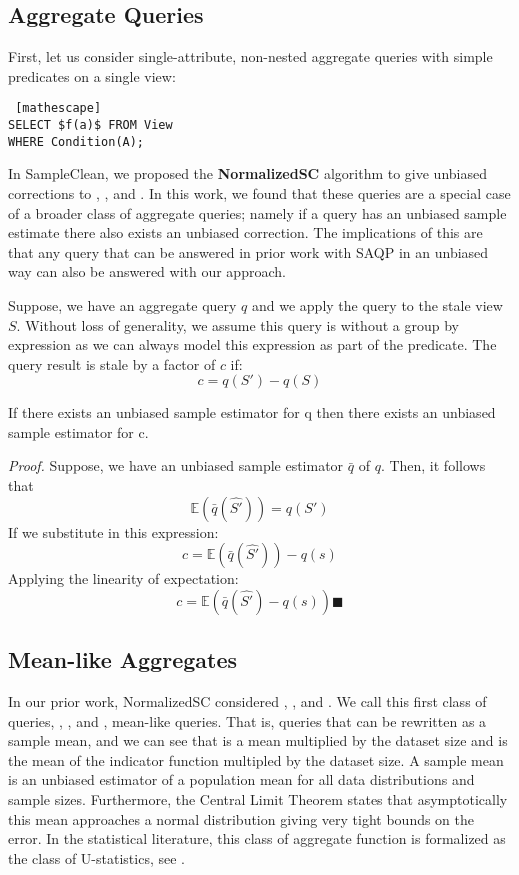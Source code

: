 \subsection{Aggregate Queries}
First, let us consider single-attribute, non-nested aggregate queries with simple predicates on a single view:
\begin{lstlisting} [mathescape]
SELECT $f(a)$ FROM View 
WHERE Condition(A);
\end{lstlisting}

In SampleClean, we proposed the \textbf{NormalizedSC} algorithm to give unbiased corrections to \sumfunc, \countfunc, and \avgfunc.
In this work, we found that these queries are a special case of a broader class of aggregate queries; namely if a query has an unbiased sample estimate there also exists an unbiased correction.
The implications of this are that any query that can be answered in prior work with SAQP in an unbiased way can also be answered with our approach.

Suppose, we have an aggregate query $q$ and we apply the query to the stale view $S$.
Without loss of generality, we assume this query is without a group by expression as we can always model this expression as part of the predicate.
The query result is stale by a factor of $c$ if:
\[ c = q(S') - q(S)\] 
\begin{lemma}
If there exists an unbiased sample estimator for q then there exists an unbiased sample estimator for c.
\end{lemma}

\emph{Proof.} Suppose, we have an unbiased sample estimator $\bar{q}$ of $q$. 
Then, it follows that \[\mathbb{E}(\bar{q}(\hat{S'})) = q(S')\]
If we substitute in this expression:
\[ c = \mathbb{E}(\bar{q}(\hat{S'})) -q(s) \] 
Applying the linearity of expectation:
\[ c = \mathbb{E}(\bar{q}(\hat{S'}) - q(s)) \blacksquare \]

\subsection{Mean-like Aggregates}
In our prior work, NormalizedSC considered \sumfunc, \countfunc, and \avgfunc.
We call this first class of queries,  \sumfunc, \countfunc, and \avgfunc, mean-like queries.
That is, queries that can be rewritten as a sample mean, and we can see that \sumfunc is a mean multiplied by the dataset size and \countfunc is the mean of the indicator function multipled by the dataset size.
A sample mean is an unbiased estimator of a population mean for all data distributions and sample sizes.
Furthermore, the Central Limit Theorem states that asymptotically this mean approaches a normal distribution giving very tight bounds on the error.
In the statistical literature, this class of aggregate function is formalized as the class of U-statistics, see \cite{hoeffding1948class}.

